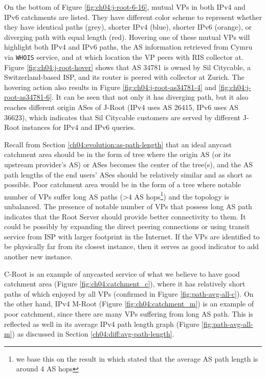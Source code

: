 On the bottom of Figure \ref{fig:ch04:j-root-6-16}, mutual VPs in both IPv4 and IPv6 catchments are listed. They have different color scheme to represent whether they have identical paths (grey), shorter IPv4 (blue), shorter IPv6 (orange), or diverging path with equal length (red). Hovering one of these mutual VPs will highlight both IPv4 and IPv6 paths, the AS information retrieved from Cymru via \texttt{WHOIS} service, and at which location the VP peers with RIS collector at. Figure \ref{fig:ch04:j-root-hover} shows that AS 34781 is owned by Sil Citycable, a Switzerland-based ISP, and its router is peered with collector at Zurich. The hovering action also results in Figure \ref{fig:ch04:j-root-as34781-4} and \ref{fig:ch04:j-root-as34781-6}. It can be seen that not only it has diverging path, but it also reaches different origin ASes of J-Root (IPv4 uses AS 26415, IPv6 uses AS 36623), which indicates that Sil Citycable customers are served by different J-Root instances for IPv4 and IPv6 queries. 

Recall from Section \ref{ch04:evolution:as-path-length} that an ideal anycast catchment area should be in the form of tree where the origin AS (or its upstream provider's AS) or ASes becomes the center of the tree(s), and the AS path lengths of the end users' ASes should be relatively similar and as short as possible. Poor catchment area would be in the form of a tree where notable number of VPs suffer long AS paths (>4 AS hops\footnote{we base this on the result in \cite{update} which stated that the average AS path length is around 4 AS hops}) and the topology is unbalanced. The presence of notable number of VPs that possess long AS path indicates that the Root Server should provide better connectivity to them. It could be possibly by expanding the direct peering connections or using transit service from ISP with larger footprint in the Internet. If the VPs are identified to be physically far from its closest instance, then it serves as good indicator to add another new instance. 

C-Root is an example of anycasted service of what we believe to have good catchment area (Figure \ref{fig:ch04:catchment_c}), where it has relatively short paths of which enjoyed by all VPs (confirmed in Figure \ref{fig:path-avg-all-c}). On the other hand, IPv4 M-Root (Figure \ref{fig:ch04:catchment_m}) is an example of poor catchment, since there are many VPs suffering from long AS path. This is reflected as well in its average IPv4 path length graph (Figure \ref{fig:path-avg-all-m}) as discussed in Section \ref{ch04:diff:avg-path-length}.

